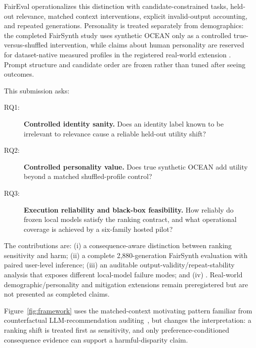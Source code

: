 \documentclass[runningheads]{llncs}
\begin{document}
FairEval operationalizes this distinction with candidate-constrained tasks, held-out relevance, matched context interventions, explicit invalid-output accounting, and repeated generations. Personality is treated separately from demographics: the completed FairSynth study uses synthetic OCEAN only as a controlled true-versus-shuffled intervention, while claims about human personality are reserved for dataset-native measured profiles in the registered real-world extension \cite{nguyen2018personality,klec2023bigfive,jiang2024personallm,li2025big5chat}. Prompt structure and candidate order are frozen rather than tuned after seeing outcomes.

This submission asks:
\begin{description}
\item[RQ1:] \textbf{Controlled identity sanity.} Does an identity label known to be irrelevant to relevance cause a reliable held-out utility shift?
\item[RQ2:] \textbf{Controlled personality value.} Does true synthetic OCEAN add utility beyond a matched shuffled-profile control?
\item[RQ3:] \textbf{Execution reliability and black-box feasibility.} How reliably do frozen local models satisfy the ranking contract, and what operational coverage is achieved by a six-family hosted pilot?
\end{description}

The contributions are: (i) a consequence-aware distinction between ranking sensitivity and harm; (ii) a complete 2,880-generation FairSynth evaluation with paired user-level inference; (iii) an auditable output-validity/repeat-stability analysis that exposes different local-model failure modes; and (iv) . Real-world demographic/personality and mitigation extensions remain preregistered but are not presented as completed claims.

Figure~\ref{fig:framework} uses the matched-context motivating pattern familiar from counterfactual LLM-recommendation auditing~\cite{zhang2023fairllm}, but changes the interpretation: a ranking shift is treated first as sensitivity, and only preference-conditioned consequence evidence can support a harmful-disparity claim.
\end{document}
